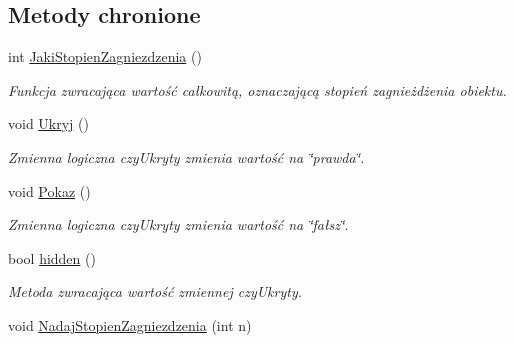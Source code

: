 \subsection*{Metody chronione}
\begin{DoxyCompactItemize}
\item 
\hypertarget{classWybor_a78db78719c9fc86ad4c3a213397baf54}{int \hyperlink{classWybor_a78db78719c9fc86ad4c3a213397baf54}{Jaki\-Stopien\-Zagniezdzenia} ()}\label{classWybor_a78db78719c9fc86ad4c3a213397baf54}

\begin{DoxyCompactList}\small\item\em Funkcja zwracająca wartość całkowitą, oznaczającą stopień zagnieżdżenia obiektu. \end{DoxyCompactList}\item 
\hypertarget{classWybor_a67fe9d804ece1158b6b45d42875b05af}{void \hyperlink{classWybor_a67fe9d804ece1158b6b45d42875b05af}{Ukryj} ()}\label{classWybor_a67fe9d804ece1158b6b45d42875b05af}

\begin{DoxyCompactList}\small\item\em Zmienna logiczna czy\-Ukryty zmienia wartość na \char`\"{}prawda\char`\"{}. \end{DoxyCompactList}\item 
\hypertarget{classWybor_a22198d1190c37209a2db625a3e3b0fef}{void \hyperlink{classWybor_a22198d1190c37209a2db625a3e3b0fef}{Pokaz} ()}\label{classWybor_a22198d1190c37209a2db625a3e3b0fef}

\begin{DoxyCompactList}\small\item\em Zmienna logiczna czy\-Ukryty zmienia wartość na \char`\"{}fałsz\char`\"{}. \end{DoxyCompactList}\item 
\hypertarget{classWybor_a76709c72cad50840901fcdb8ee365f1f}{bool \hyperlink{classWybor_a76709c72cad50840901fcdb8ee365f1f}{hidden} ()}\label{classWybor_a76709c72cad50840901fcdb8ee365f1f}

\begin{DoxyCompactList}\small\item\em Metoda zwracająca wartość zmiennej czy\-Ukryty. \end{DoxyCompactList}\item 
\hypertarget{classWybor_a3257df3c35728ec264a51dce3ac28f55}{void \hyperlink{classWybor_a3257df3c35728ec264a51dce3ac28f55}{Nadaj\-Stopien\-Zagniezdzenia} (int n)}\label{classWybor_a3257df3c35728ec264a51dce3ac28f55}


\end{DoxyCompactItemize}
